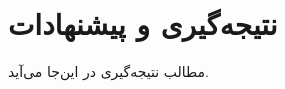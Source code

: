 
\chapter{نتیجه‌گیری و پیشنهادات}\label{conclution}

مطالب نتیجه‌گیری در این‌جا می‌آید.




























